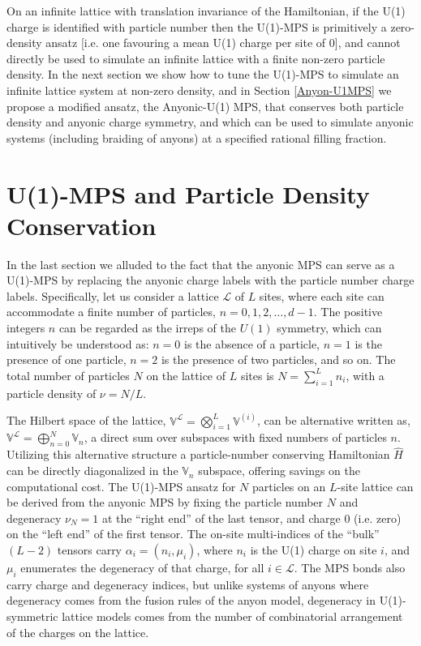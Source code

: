 \documentclass[aps,reprint,superscriptaddress,amsmath,amssymb,amsfonts,prb]{revtex4-1}
\begin{document}
{On an infinite lattice {with} translation invariance of the Hamiltonian, {if the U(1) charge is identified with particle number then} the U(1)-MPS is primitively a zero-density ansatz {[i.e. one favouring a mean U(1) charge per site of 0],} and cannot directly be used to simulate an infinite lattice with a finite non-zero {particle} density. In the next section we show how to tune the U(1)-MPS to simulate an infinite lattice system at non-zero density, and in Section \ref{Anyon-U1MPS} we propose a modified ansatz, the Anyonic-U(1) MPS, that conserves both particle density and anyonic charge symmetry, and which can be used to simulate anyonic systems (including braiding of anyons) at a specified rational {filling fraction}.}



\section{U(1)-MPS and Particle Density Conservation} \label{U1-MPS}
In the last section we alluded to the fact that the anyonic MPS can serve as a U(1)-MPS by replacing the anyonic charge labels with the particle number charge labels. Specifically, let us consider a lattice $\mathcal{L}$ of $L$ sites, where each site can accommodate a finite number of particles, $n=0,1,2, \ldots, d-1$. The positive integers $n$ can be regarded as the irreps of the $U(1)$ symmetry, which can intuitively be understood as: $n=0$ is the absence of a particle, $n=1$ is the presence of one particle, $n=2$ is the presence of two particles, and so on. The total number of particles $N$ on the lattice of $L$ sites is $N=\sum_{i=1}^L n_i$, {with} a {particle} density of $\nu=N/L$.

The Hilbert space of the lattice, $\mathbb{V}^{\mathcal{L}} = \bigotimes_{i=1}^L \mathbb{V}^{(i)}$, can be alternative written as,  $\mathbb{V}^{\mathcal{L}} = \bigoplus_{n=0}^N \mathbb{V}_n$, {a} direct sum {over} subspace{s} with fixed number{s} of particles $n$. Utilizing this alternative structure a particle-number conserving Hamiltonian $\hat{H}$ can be directly diagonalized in the $\mathbb{V}_n$ subspace, offering savings on the computational cost. The U(1)-MPS ansatz for $N$ particles on an $L$-site lattice can be derived from the anyonic MPS by fixing the particle number $N$ and degeneracy $\nu_N=1$ at the ``right end'' of the last tensor, and charge $0$ (i.e. zero) on the ``left end'' of the first tensor. The on-site multi-indices of the ``bulk'' $(L-2)$ tensors carry $\alpha_i = (n_i, \mu_i)$, where $n_i$ is the U(1) charge on site $i$, and $\mu_i$ enumerates the degeneracy of that charge, for all $i \in \mathcal{L}$. 
The MPS bonds also carry charge and degeneracy 
indices, but unlike systems of anyons where degeneracy comes from the fusion rules of the anyon model, degeneracy in U(1)-symmetric lattice models comes from the number of combinatorial arrangement of the charges on the lattice. 
\end{document}
